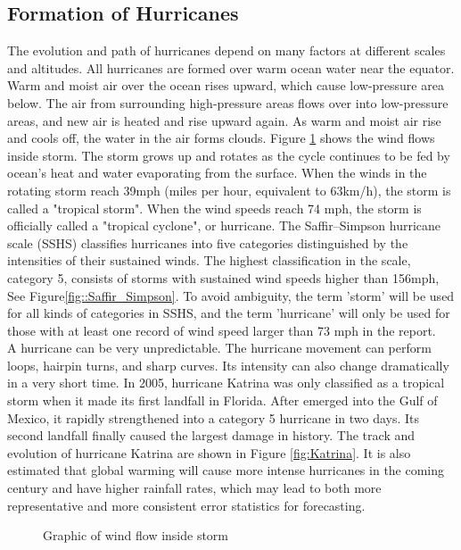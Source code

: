 \subsection{Formation of Hurricanes}
The evolution and path of hurricanes depend on many factors at different scales and altitudes. All hurricanes are formed over warm ocean water near the equator. Warm and moist air over the ocean rises upward, which cause low-pressure area below. The air from surrounding high-pressure areas flows over into low-pressure areas, and new air is heated and rise upward again. As warm and moist air rise and cools off, the water in the air forms clouds. Figure \ref{fig:hurricane_section} shows the wind flows inside storm. The storm grows up and rotates as the cycle continues to be fed by ocean's heat and water evaporating from the surface. When the winds in the rotating storm reach 39mph (miles per hour, equivalent to 63km/h), the storm is called a "tropical storm". When the wind speeds reach 74 mph, the storm is officially called a "tropical cyclone", or hurricane. The Saffir–Simpson hurricane scale (SSHS) classifies hurricanes into five categories distinguished by the intensities of their sustained winds. The highest classification in the scale, category 5, consists of storms with sustained wind speeds higher than 156mph, See Figure\ref{fig::Saffir_Simpson}. To avoid ambiguity, the term 'storm' will be used for all kinds of categories in SSHS, and the term 'hurricane' will only be used for those with at least one record of wind speed larger than 73 mph in the report. \\
A hurricane can be very unpredictable. The hurricane movement can perform loops, hairpin turns, and sharp curves. Its intensity can also change dramatically in a very short time. In 2005, hurricane Katrina was only classified as a tropical storm when it made its first landfall in Florida. After emerged into the Gulf of Mexico, it rapidly strengthened into a category 5 hurricane in two days. Its second landfall finally caused the largest damage in history. The track and evolution of hurricane Katrina are shown in Figure \ref{fig:Katrina}.  It is also estimated that global warming will cause more intense hurricanes in the coming century and have higher rainfall rates\cite{knutson2013dynamical}, which may lead to both more representative and more consistent error statistics for forecasting.

\begin{figure}[t]
	\begin{center}
		\hsize {}
	\end{center}
	\caption{Graphic of wind flow inside storm \cite{hurricane_energy}}
	\label{fig:hurricane_section}
\end{figure}



